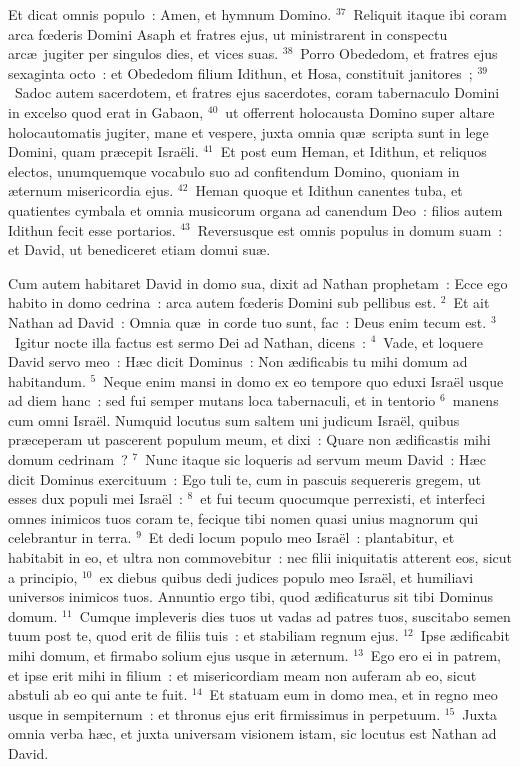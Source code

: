  Et dicat omnis populo~: Amen, et hymnum Domino.
${}^{37}$~Reliquit itaque ibi coram arca fœderis Domini Asaph et fratres ejus, ut ministrarent in conspectu arc\ae\ jugiter per singulos dies, et vices suas.
${}^{38}$~Porro Obededom, et fratres ejus sexaginta octo~: et Obededom filium Idithun, et Hosa, constituit janitores~;
${}^{39}$~Sadoc autem sacerdotem, et fratres ejus sacerdotes, coram tabernaculo Domini in excelso quod erat in Gabaon,
${}^{40}$~ut offerrent holocausta Domino super altare holocautomatis jugiter, mane et vespere, juxta omnia qu\ae\ scripta sunt in lege Domini, quam pr\ae cepit Isra\"eli.
${}^{41}$~Et post eum Heman, et Idithun, et reliquos electos, unumquemque vocabulo suo ad confitendum Domino, quoniam in \ae ternum misericordia ejus.
${}^{42}$~Heman quoque et Idithun canentes tuba, et quatientes cymbala et omnia musicorum organa ad canendum Deo~: filios autem Idithun fecit esse portarios.
${}^{43}$~Reversusque est omnis populus in domum suam~: et David, ut benediceret etiam domui su\ae .

\bchapter
\lettrine[lines=3,image=true,loversize=0.05,lraise=-0.03]{C}{}um autem habitaret David in domo sua, dixit ad Nathan prophetam~: Ecce ego habito in domo cedrina~: arca autem fœderis Domini sub pellibus est.
${}^{2}$~Et ait Nathan ad David~: Omnia qu\ae\ in corde tuo sunt, fac~: Deus enim tecum est.
${}^{3}$~Igitur nocte illa factus est sermo Dei ad Nathan, dicens~:
${}^{4}$~Vade, et loquere David servo meo~: H\ae c dicit Dominus~: Non \ae dificabis tu mihi domum ad habitandum.
${}^{5}$~Neque enim mansi in domo ex eo tempore quo eduxi Isra\"el usque ad diem hanc~: sed fui semper mutans loca tabernaculi, et in tentorio
${}^{6}$~manens cum omni Isra\"el. Numquid locutus sum saltem uni judicum Isra\"el, quibus pr\ae ceperam ut pascerent populum meum, et dixi~: Quare non \ae dificastis mihi domum cedrinam~?
${}^{7}$~Nunc itaque sic loqueris ad servum meum David~: H\ae c dicit Dominus exercituum~: Ego tuli te, cum in pascuis sequereris gregem, ut esses dux populi mei Isra\"el~:
${}^{8}$~et fui tecum quocumque perrexisti, et interfeci omnes inimicos tuos coram te, fecique tibi nomen quasi unius magnorum qui celebrantur in terra.
${}^{9}$~Et dedi locum populo meo Isra\"el~: plantabitur, et habitabit in eo, et ultra non commovebitur~: nec filii iniquitatis atterent eos, sicut a principio,
${}^{10}$~ex diebus quibus dedi judices populo meo Isra\"el, et humiliavi universos inimicos tuos. Annuntio ergo tibi, quod \ae dificaturus sit tibi Dominus domum.
${}^{11}$~Cumque impleveris dies tuos ut vadas ad patres tuos, suscitabo semen tuum post te, quod erit de filiis tuis~: et stabiliam regnum ejus.
${}^{12}$~Ipse \ae dificabit mihi domum, et firmabo solium ejus usque in \ae ternum.
${}^{13}$~Ego ero ei in patrem, et ipse erit mihi in filium~: et misericordiam meam non auferam ab eo, sicut abstuli ab eo qui ante te fuit.
${}^{14}$~Et statuam eum in domo mea, et in regno meo usque in sempiternum~: et thronus ejus erit firmissimus in perpetuum.
${}^{15}$~Juxta omnia verba h\ae c, et juxta universam visionem istam, sic locutus est Nathan ad David.


